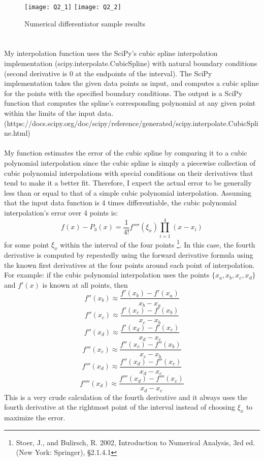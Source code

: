 \documentclass{article}
\newcommand{\<}[1]{\left\langle #1 \right\rangle }
\begin{document}
\begin{figure}[h]
	\caption{Numerical differentiator sample results}
	\texttt{[image: Q2\_1]}
	\texttt{[image: Q2\_2]} 
\end{figure}

\newpage
\section{}
My interpolation function uses the SciPy's cubic spline interpolation implementation (scipy.interpolate.CubicSpline) with natural boundary conditions (second derivative is 0 at the endpoints of the interval). The SciPy implementation takes the given data points as input, and computes a cubic spline for the points with the specified boundary conditions. The output is a SciPy function that computes the spline's corresponding polynomial at any given point within the limits of the input data. (https://docs.scipy.org/doc/scipy/reference/generated/scipy.interpolate.CubicSpline.html)\\
\\
My function estimates the error of the cubic spline by comparing it to a cubic polynomial interpolation since the cubic spline is simply a piecewise collection of cubic polynomial interpolations with special conditions on their derivatives that tend to make it a better fit. Therefore, I expect the actual error to be generally less than or equal to that of a simple cubic polynomial interpolation. Assuming that the input data function is 4 times differentiable, the cubic polynomial interpolation's error over 4 points is:
\[f(x) - P_3(x) = \frac{1}{4!}f''''(\xi_x)\prod_{i=1}^{4}(x-x_i)\] 
for some point $\xi_x$ within the interval of the four points \footnote{Stoer, J., and Bulirsch, R. 2002, Introduction to Numerical Analysis, 3rd ed. (New York: Springer), \S 2.1.4.1}. In this case, the fourth derivative is computed by repeatedly using the forward derivative formula using the known first derivatives at the four points around each point of interpolation. For example: if the cubic polynomial interpolation uses the points $\{x_a, x_b, x_c, x_d\}$ and $f'(x)$ is known at all points, then
\[f''(x_b) \approx \frac{f'(x_b) - f'(x_a)}{x_b-x_a}\]
\[f''(x_c) \approx \frac{f'(x_c) - f'(x_b)}{x_c-x_b}\]
\[f''(x_d) \approx \frac{f'(x_d) - f'(x_c)}{x_d-x_c}\]
\[f'''(x_c) \approx \frac{f''(x_c) - f''(x_b)}{x_c-x_b}\]
\[f'''(x_d) \approx \frac{f''(x_d) - f''(x_c)}{x_d-x_c}\]
\[f''''(x_d) \approx \frac{f'''(x_d) - f'''(x_c)}{x_d-x_c}\]
This is a very crude calculation of the fourth derivative and it always uses the fourth derivative at the rightmost point of the interval instead of choosing $\xi_x$ to maximize the error.\\
\end{document}
